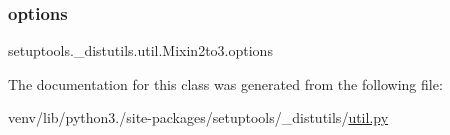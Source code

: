 \mbox{\label{classsetuptools_1_1__distutils_1_1util_1_1Mixin2to3_a1990de05f221e518e0b5825fa76cdc14}} 
\subsubsection{\texorpdfstring{options}{options}}
{\footnotesize\ttfamily setuptools.\+\_\+distutils.\+util.\+Mixin2to3.\+options\hspace{0.3cm}{\ttfamily [static]}}



The documentation for this class was generated from the following file\+:\begin{DoxyCompactItemize}
\item 
venv/lib/python3./site-\/packages/setuptools/\+\_\+distutils/\hyperlink{setuptools_2__distutils_2util_8py}{util.\+py}\end{DoxyCompactItemize}
